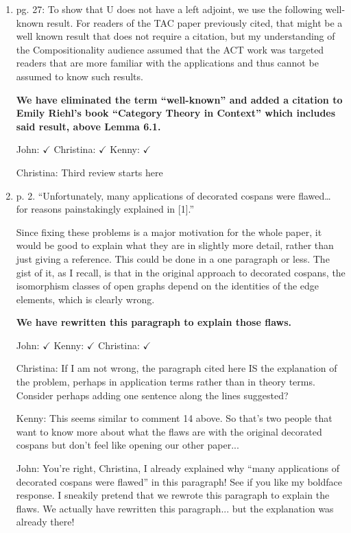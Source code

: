 \documentclass[reqno]{amsart}
\def\chris{\color{purple} Christina: }
\def\john{\color{red} John: }
\def\kenny{\color{blue} Kenny: }
\begin{document}
\begin{enumerate}
\item pg. 27: To show that U does not have a left adjoint, we use the following well-known result. For readers of the TAC paper previously cited, 
that might 
be a well known result that does not require a citation, but my understanding of the Compositionality audience assumed that the ACT work was targeted 
readers that are more familiar with the applications and thus cannot be assumed to know such results.

{\bf We have eliminated the term ``well-known'' and added a citation to Emily Riehl's book ``Category Theory in Context'' which includes said result, above Lemma 6.1.}  


{\john $\checkmark$} {\chris $\checkmark$} {\kenny $\checkmark$}

{\chris Third review starts here}
\item p. 2. ``Unfortunately, many applications of decorated cospans were flawed… for reasons painstakingly explained in [1].''

Since fixing these problems is a major motivation for the whole paper, it would be good to explain what they are in slightly more detail, rather than 
just giving a reference. This could be done in a one paragraph or less. The gist of it, as I recall, is that in the original approach to decorated 
cospans, the isomorphism classes of open graphs depend on the identities of the edge elements, which is clearly wrong.

{\bf We have rewritten this paragraph to explain those flaws.}

{\john $\checkmark$} {\kenny $\checkmark$} {\chris $\checkmark$}

\iffalse
{\chris If I am not wrong, the paragraph cited here IS the explanation of the problem, perhaps in application terms rather than in theory terms. 
Consider perhaps adding one sentence along the lines suggested?}

{\kenny This seems similar to comment 14 above. So that's two people that want to know more about what the flaws are with the original decorated cospans but don't feel like opening our other paper...}

{\john You're right, Christina, I already explained why ``many applications of decorated cospans were flawed'' in this paragraph!   See if you like my boldface response.  I sneakily pretend that we rewrote this paragraph to explain the flaws.  We actually have rewritten this paragraph... but the explanation was already there!

}
\end{enumerate}
\end{document}
